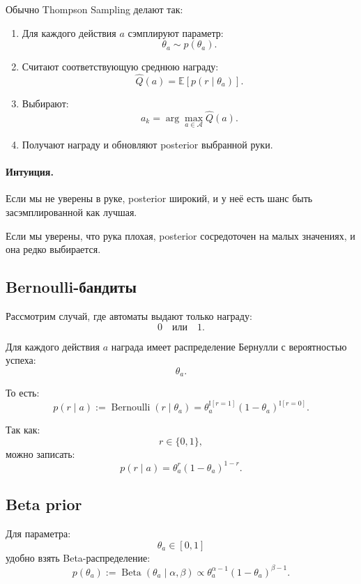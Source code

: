 \documentclass[12pt,a4paper]{article}
\begin{document}
Обычно Thompson Sampling делают так:

\begin{enumerate}
    \item Для каждого действия $a$ сэмплируют параметр:
    \[
    \theta_a\sim p(\theta_a).
    \]

    \item Считают соответствующую среднюю награду:
    \[
    \hat Q(a)
    =
    \mathbb E
    \left[
    p(r\mid\theta_a)
    \right].
    \]

    \item Выбирают:
    \[
    a_k
    =
    \arg\max_{a\in\mathcal A}
    \hat Q(a).
    \]

    \item Получают награду и обновляют posterior выбранной руки.
\end{enumerate}

\paragraph{Интуиция.}

Если мы не уверены в руке, posterior широкий, и у неё есть шанс быть засэмплированной как лучшая.

Если мы уверены, что рука плохая, posterior сосредоточен на малых значениях, и она редко выбирается.

\subsection{Bernoulli-бандиты}

Рассмотрим случай, где автоматы выдают только награду:
\[
0
\quad
\text{или}
\quad
1.
\]

Для каждого действия $a$ награда имеет распределение Бернулли с вероятностью успеха:
\[
\theta_a.
\]

То есть:
\[
p(r\mid a)
:=
\operatorname{Bernoulli}(r\mid \theta_a)
=
\theta_a^{\mathbb I[r=1]}
(1-\theta_a)^{\mathbb I[r=0]}.
\]

Так как:
\[
r\in\{0,1\},
\]
можно записать:
\[
p(r\mid a)
=
\theta_a^r
(1-\theta_a)^{1-r}.
\]

\subsection{Beta prior}

Для параметра:
\[
\theta_a\in[0,1]
\]
удобно взять Beta-распределение:
\[
p(\theta_a)
:=
\operatorname{Beta}(\theta_a\mid \alpha,\beta)
\propto
\theta_a^{\alpha-1}
(1-\theta_a)^{\beta-1}.
\]
\end{document}
